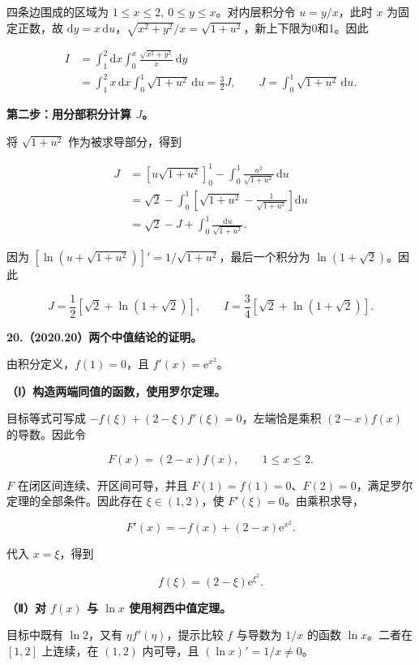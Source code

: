 \documentclass[UTF8,11pt,fontset=windows]{ctexart}
\begin{document}
四条边围成的区域为 $1\le x\le2,\ 0\le y\le x$。对内层积分令 $u=y/x$，此时 $x$ 为固定正数，故 $\mathrm dy=x\,\mathrm du$，$\sqrt{x^2+y^2}/x=\sqrt{1+u^2}$，新上下限为0和1。因此

$$
\begin{aligned}
I&=\int_1^2\mathrm dx\int_0^x\frac{\sqrt{x^2+y^2}}x\,\mathrm dy\\
&=\int_1^2x\,\mathrm dx\int_0^1\sqrt{1+u^2}\,\mathrm du
=\frac32J,
\qquad J=\int_0^1\sqrt{1+u^2}\,\mathrm du.
\end{aligned}
$$

\textbf{第二步：用分部积分计算 $J$。}

将 $\sqrt{1+u^2}$ 作为被求导部分，得到

$$
\begin{aligned}
J&=\left[u\sqrt{1+u^2}\right]_0^1
 -\int_0^1\frac{u^2}{\sqrt{1+u^2}}\,\mathrm du\\
&=\sqrt2-\int_0^1\left[\sqrt{1+u^2}-\frac1{\sqrt{1+u^2}}\right]\mathrm du\\
&=\sqrt2-J+\int_0^1\frac{\mathrm du}{\sqrt{1+u^2}}.
\end{aligned}
$$

因为 $[\ln(u+\sqrt{1+u^2})]'=1/\sqrt{1+u^2}$，最后一个积分为 $\ln(1+\sqrt2)$。因此

$$
J=\frac12[\sqrt2+\ln(1+\sqrt2)],
\qquad
\boxed{I=\frac34[\sqrt2+\ln(1+\sqrt2)]}.
$$

\clearpage

\textbf{20.（2020.20）两个中值结论的证明。}

由积分定义，$f(1)=0$，且 $f'(x)=\mathrm e^{x^2}$。

\textbf{（Ⅰ）构造两端同值的函数，使用罗尔定理。}

目标等式可写成 $-f(\xi)+(2-\xi)f'(\xi)=0$，左端恰是乘积 $(2-x)f(x)$ 的导数。因此令

$$
F(x)=(2-x)f(x),\qquad 1\le x\le2.
$$

$F$ 在闭区间连续、开区间可导，并且 $F(1)=f(1)=0$、$F(2)=0$，满足罗尔定理的全部条件。因此存在 $\xi\in(1,2)$，使 $F'(\xi)=0$。由乘积求导，

$$
F'(x)=-f(x)+(2-x)\mathrm e^{x^2}.
$$

代入 $x=\xi$，得到

$$
\boxed{f(\xi)=(2-\xi)\mathrm e^{\xi^2}}.
$$

\textbf{（Ⅱ）对 $f(x)$ 与 $\ln x$ 使用柯西中值定理。}

目标中既有 $\ln2$，又有 $\eta f'(\eta)$，提示比较 $f$ 与导数为 $1/x$ 的函数 $\ln x$。二者在 $[1,2]$ 上连续，在 $(1,2)$ 内可导，且 $(\ln x)'=1/x\ne0$。
\end{document}
